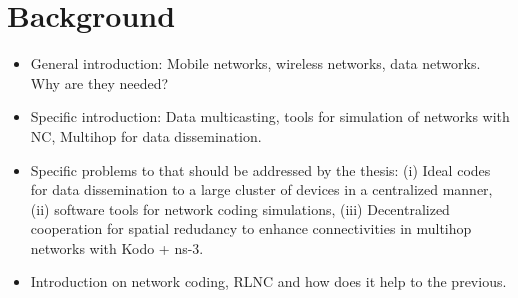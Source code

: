 \section{Background}\label{sec:background}

\begin{itemize}
\item General introduction: Mobile networks, wireless networks, data networks. Why are they needed?
\item Specific introduction: Data multicasting, tools for simulation of networks with \ac{NC}, Multihop for data dissemination.
\item Specific problems to that should be addressed by the thesis: (i) Ideal codes for data dissemination to a large cluster of devices in a centralized manner, (ii) software tools for network coding simulations, (iii) Decentralized cooperation for spatial redudancy to enhance connectivities in multihop networks with Kodo + ns-3.
\item Introduction on network coding, RLNC and how does it help to the previous.
\end{itemize}
